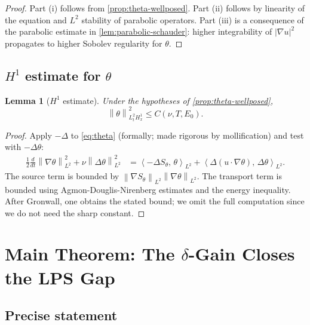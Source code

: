 \documentclass[12pt]{article}
\theoremstyle{plain}
\newtheorem{lemma}[theorem]{Lemma}
\theoremstyle{definition}
\theoremstyle{remark}
\newcommand{\norm}[1]{\left\|#1\right\|}
\newcommand{\abs}[1]{\left|#1\right|}
\newcommand{\inner}[2]{\left\langle #1,\, #2\right\rangle}
\newcommand{\grad}{\nabla}
\newcommand{\lap}{\Delta}
\begin{document}
\begin{proof}
  Part (i) follows from \cref{prop:theta-wellposed}.
  Part (ii) follows by linearity of the equation and $L^2$ stability of
  parabolic operators.
  Part (iii) is a consequence of the parabolic estimate in
  \cref{lem:parabolic-schauder}: higher integrability of $\abs{\grad u}^2$
  propagates to higher Sobolev regularity for $\theta$.
\end{proof}

\subsection{$H^1$ estimate for $\theta$}

\begin{lemma}[$H^1$ estimate]\label{lem:theta-H1}
  Under the hypotheses of \cref{prop:theta-wellposed},
  \[
    \norm{\theta}_{L^2_t H^1_x}^2
    \leq C(\nu,T,E_0).
  \]
\end{lemma}

\begin{proof}
  Apply $-\lap$ to \eqref{eq:theta} (formally; made rigorous by mollification)
  and test with $-\lap\theta$:
  \begin{align*}
    \frac{1}{2}\frac{d}{dt}\norm{\grad\theta}_{L^2}^2
    + \nu\norm{\lap\theta}_{L^2}^2
    &= \inner{-\lap S_\theta}{\theta}_{L^2}
    + \inner{\lap(u\cdot\grad\theta)}{\lap\theta}_{L^2}.
  \end{align*}
  The source term is bounded by $\norm{\grad S_\theta}_{L^2}\norm{\grad\theta}_{L^2}$.
  The transport term is bounded using Agmon-Douglis-Nirenberg estimates
  and the energy inequality.
  After Gronwall, one obtains the stated bound; we omit the full computation
  since we do not need the sharp constant.
\end{proof}

\section{Main Theorem: The $\delta$-Gain Closes the LPS Gap}\label{sec:main}

\subsection{Precise statement}
\end{document}
